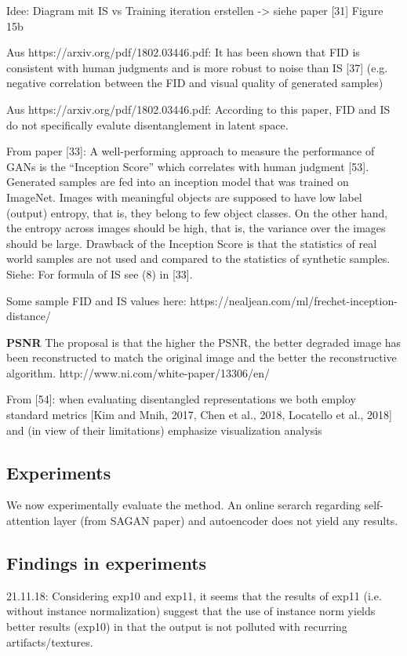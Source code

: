 \documentclass[12pt,a4paper]{article}
\begin{document}
Idee: Diagram mit IS vs Training iteration erstellen -> siehe paper [31] Figure 15b

Aus https://arxiv.org/pdf/1802.03446.pdf: It has been shown that FID is consistent with human judgments and is more robust to noise than IS [37] (e.g. negative correlation between the FID and visual quality of generated samples)

Aus https://arxiv.org/pdf/1802.03446.pdf: According to this paper, FID and IS do not specifically evalute disentanglement in latent space.

From paper [33]: A well-performing approach to measure the performance of GANs is the
“Inception Score” which correlates with human judgment [53]. Generated samples are fed into an
inception model that was trained on ImageNet. Images with meaningful objects are supposed to
have low label (output) entropy, that is, they belong to few object classes. On the other hand, the
entropy across images should be high, that is, the variance over the images should be large. Drawback
of the Inception Score is that the statistics of real world samples are not used and compared to the
statistics of synthetic samples.
Siehe: For formula of IS see (8) in [33].
    
Some sample FID and IS values here: https://nealjean.com/ml/frechet-inception-distance/    
    
\par \textbf{PSNR} The proposal is that the higher the PSNR, the better degraded image has been reconstructed to match the original image and the better the reconstructive algorithm.
http://www.ni.com/white-paper/13306/en/
    
\par From [54]: when evaluating disentangled representations we both employ standard metrics [Kim and Mnih, 2017, Chen et al., 2018, Locatello et al., 2018] and (in view of their limitations) emphasize visualization analysis    
    
\subsection{Experiments}
We now experimentally evaluate the method. An online serarch regarding self-attention layer (from SAGAN paper) and autoencoder does not yield any results.

\subsection{Findings in experiments}
21.11.18: Considering exp10 and exp11, it seems that the results of exp11 (i.e. without instance normalization) suggest that the use of instance norm yields better results (exp10) in that the output is not polluted with recurring artifacts/textures.
\end{document}
